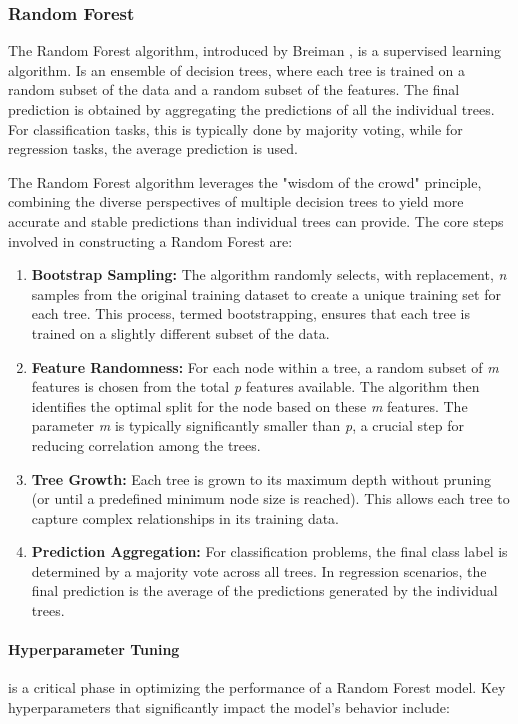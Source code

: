\subsubsection{Random Forest}
The Random Forest algorithm, introduced by Breiman \cite{breiman2001random}, is a supervised learning algorithm.
Is an ensemble of decision trees, where each tree is trained on a random subset of the data and a random subset of the features.
The final prediction is obtained by aggregating the predictions of all the individual trees.
For classification tasks, this is typically done by majority voting, while for regression tasks, the average prediction is used.

The Random Forest algorithm leverages the "wisdom of the crowd" principle, combining the diverse perspectives of multiple decision trees to yield more accurate and stable predictions than individual trees can provide.
The core steps involved in constructing a Random Forest are:

\begin{enumerate}
    \item \textbf{Bootstrap Sampling:} The algorithm randomly selects, with replacement, \textit{n} samples from the original training dataset to create a unique training set for each tree.
    This process, termed bootstrapping, ensures that each tree is trained on a slightly different subset of the data.
    \item \textbf{Feature Randomness:} For each node within a tree, a random subset of \textit{m} features is chosen from the total \textit{p} features available.
    The algorithm then identifies the optimal split for the node based on these \textit{m} features.
    The parameter \textit{m} is typically significantly smaller than \textit{p}, a crucial step for reducing correlation among the trees.
    \item \textbf{Tree Growth:} Each tree is grown to its maximum depth without pruning (or until a predefined minimum node size is reached).
    This allows each tree to capture complex relationships in its training data.
    \item \textbf{Prediction Aggregation:} For classification problems, the final class label is determined by a majority vote across all trees.
    In regression scenarios, the final prediction is the average of the predictions generated by the individual trees.
\end{enumerate}

\paragraph{Hyperparameter Tuning} is a critical phase in optimizing the performance of a Random Forest model.
Key hyperparameters that significantly impact the model's behavior include:

